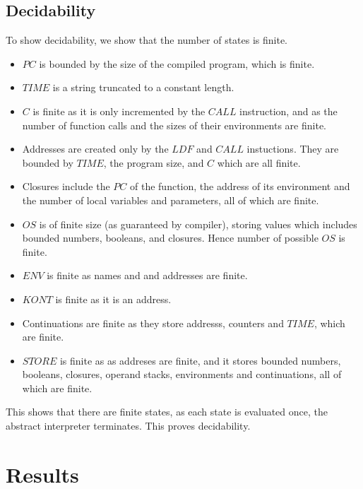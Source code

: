\documentclass[12pt]{article}
\begin{document}
\subsection{Decidability}
To show decidability, we show that the number of states is finite. 
\begin{itemize}
  \item $PC$ is bounded by the size of the compiled program, which is finite.
        
  \item $TIME$ is a string truncated to a constant length.
        
  \item $C$ is finite as it is only incremented by the $CALL$ instruction, and as the number of function calls and the sizes of their environments are finite.
        
  \item Addresses are created only by the $LDF$ and $CALL$ instuctions. They are bounded by $TIME$, the program size, and $C$ which are all finite.
        
  \item Closures include the $PC$ of the function, the address of its environment and the number of local variables and parameters, all of which are finite.
        
  \item $OS$ is of finite size (as guaranteed by compiler), storing values which includes bounded numbers, booleans, and closures. Hence number of possible $OS$ is finite.
        
  \item $ENV$ is finite as names and and addresses are finite.
        
  \item $KONT$ is finite as it is an address.
        
  \item Continuations are finite as they store addresss, counters and $TIME$, which are finite.
        
  \item $STORE$ is finite as as addreses are finite, and it stores bounded numbers, booleans, closures, operand stacks, environments and continuations, all of which are finite.
\end{itemize}

This shows that there are finite states, as each state is evaluated once, the abstract interpreter terminates. This proves decidability.

\section{Results}
\end{document}
